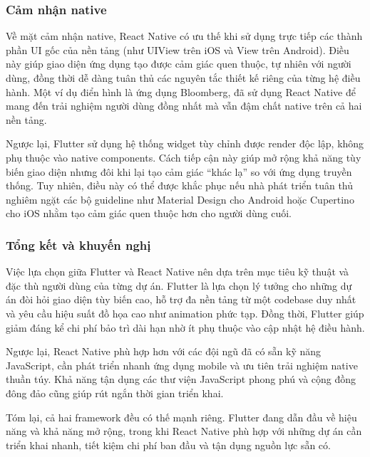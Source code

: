 \subsubsection{Cảm nhận native}


    Về mặt cảm nhận native, React Native có ưu thế khi sử dụng trực tiếp các thành phần UI gốc của nền tảng (như UIView trên iOS và View trên Android). Điều này giúp giao diện ứng dụng tạo được cảm giác quen thuộc, tự nhiên với người dùng, đồng thời dễ dàng tuân thủ các nguyên tắc thiết kế riêng của từng hệ điều hành. Một ví dụ điển hình là ứng dụng Bloomberg, đã sử dụng React Native để mang đến trải nghiệm người dùng đồng nhất mà vẫn đậm chất native trên cả hai nền tảng.

    \vspace{0.5em}

    Ngược lại, Flutter sử dụng hệ thống widget tùy chỉnh được render độc lập, không phụ thuộc vào native components. Cách tiếp cận này giúp mở rộng khả năng tùy biến giao diện nhưng đôi khi lại tạo cảm giác “khác lạ” so với ứng dụng truyền thống. Tuy nhiên, điều này có thể được khắc phục nếu nhà phát triển tuân thủ nghiêm ngặt các bộ guideline như Material Design cho Android hoặc Cupertino cho iOS nhằm tạo cảm giác quen thuộc hơn cho người dùng cuối.

\subsubsection{Tổng kết và khuyến nghị}


    Việc lựa chọn giữa Flutter và React Native nên dựa trên mục tiêu kỹ thuật và đặc thù người dùng của từng dự án. Flutter là lựa chọn lý tưởng cho những dự án đòi hỏi giao diện tùy biến cao, hỗ trợ đa nền tảng từ một codebase duy nhất và yêu cầu hiệu suất đồ họa cao như animation phức tạp. Đồng thời, Flutter giúp giảm đáng kể chi phí bảo trì dài hạn nhờ ít phụ thuộc vào cập nhật hệ điều hành.

    \vspace{0.5em}

    Ngược lại, React Native phù hợp hơn với các đội ngũ đã có sẵn kỹ năng JavaScript, cần phát triển nhanh ứng dụng mobile và ưu tiên trải nghiệm native thuần túy. Khả năng tận dụng các thư viện JavaScript phong phú và cộng đồng đông đảo cũng giúp rút ngắn thời gian triển khai.

    \vspace{0.5em}

    Tóm lại, cả hai framework đều có thế mạnh riêng. Flutter đang dẫn đầu về hiệu năng và khả năng mở rộng, trong khi React Native phù hợp với những dự án cần triển khai nhanh, tiết kiệm chi phí ban đầu và tận dụng nguồn lực sẵn có.